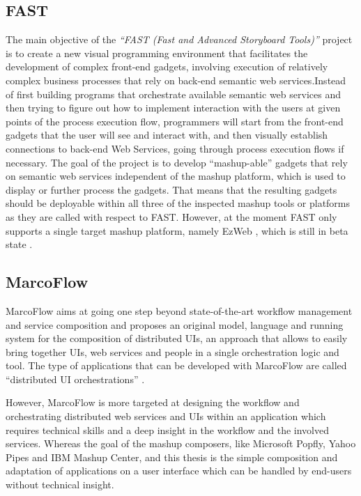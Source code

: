 \subsection{FAST}
The main objective of the \textit{``FAST (Fast and Advanced Storyboard Tools)''} project \cite{fast}
is to create a new visual programming environment that facilitates the development of complex
front-end gadgets, involving execution of relatively complex business processes that rely on back-end
semantic web services.\newline Instead of first building programs that orchestrate available
semantic web services and then trying to figure out how to implement interaction with the users at
given points of the process execution flow, programmers will start from the front-end gadgets that the user will see
and interact with, and then visually establish connections to back-end Web Services, going through
process execution flows if necessary.\newline
The goal of the project is to develop ``mashup-able'' gadgets that rely on semantic web services
independent of the mashup platform, which is used to display or further process the gadgets. That
means that the resulting gadgets should be deployable within all three of the inspected mashup tools or
platforms as they are called with respect to FAST. However, at the moment FAST only supports a
single target mashup platform, namely EzWeb \cite{ezweb}, which is still in beta state
\cite{fast_paper}.

\subsection{MarcoFlow}
MarcoFlow aims at going one step beyond state-of-the-art workflow management and service composition
and proposes an original model, language and running system for the composition of distributed UIs,
an approach that allows to easily bring together UIs, web services and people in a single
orchestration logic and tool. The type of applications that can be developed with MarcoFlow are
called ``distributed UI orchestrations'' \cite{marcoflow}.

However, MarcoFlow is more targeted at designing the workflow and orchestrating distributed web
services and UIs within an application which requires technical skills and a deep insight in the
workflow and the involved services. Whereas the goal of the mashup composers, like Microsoft Popfly,
Yahoo Pipes and IBM Mashup Center, and this thesis is the simple composition and adaptation of
applications on a user interface which can be handled by end-users without technical insight.

